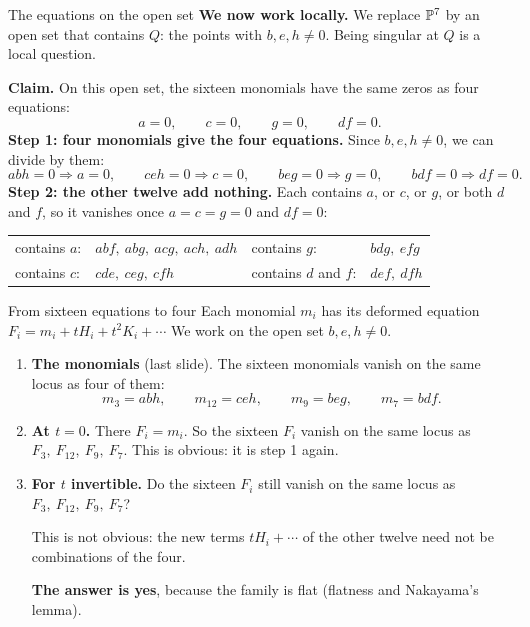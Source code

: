 \begin{frame}{The equations on the open set}
\textbf{We now work locally.} We replace \(\mathbb P^7\) by an open set that contains \(Q\): the points with \(b,e,h\ne0\). Being singular at \(Q\) is a local question.
\par\medskip
\textbf{Claim.} On this open set, the sixteen monomials have the same zeros as four equations:
\[
\boxed{a=0,\qquad c=0,\qquad g=0,\qquad df=0.}
\]
\textbf{Step 1: four monomials give the four equations.} Since \(b,e,h\ne0\), we can divide by them:
\[
abh=0\Rightarrow a=0,\qquad ceh=0\Rightarrow c=0,\qquad beg=0\Rightarrow g=0,\qquad bdf=0\Rightarrow df=0.
\]
\textbf{Step 2: the other twelve add nothing.} Each contains \(a\), or \(c\), or \(g\), or both \(d\) and \(f\), so it vanishes once \(a=c=g=0\) and \(df=0\):
\begin{center}
\begin{tabular}{ll@{\qquad}ll}
contains \(a\):&\(abf,\ abg,\ acg,\ ach,\ adh\)&contains \(g\):&\(bdg,\ efg\)\\
contains \(c\):&\(cde,\ ceg,\ cfh\)&contains \(d\) and \(f\):&\(def,\ dfh\)
\end{tabular}
\end{center}
\src{\textcolor{red}{This slide needs verification (not complicated, just need to check).}}
\end{frame}

\begin{frame}{From sixteen equations to four}
Each monomial \(m_i\) has its deformed equation \(F_i=m_i+tH_i+t^2K_i+\cdots\) We work on the open set \(b,e,h\ne0\).
\begin{enumerate}
\setlength{\itemsep}{9pt}
\item \textbf{The monomials} (last slide). The sixteen monomials vanish on the same locus as four of them:
\[
m_3=abh,\qquad m_{12}=ceh,\qquad m_9=beg,\qquad m_7=bdf.
\]
\item \textbf{At \(t=0\).} There \(F_i=m_i\). So the sixteen \(F_i\) vanish on the same locus as \(F_3,\ F_{12},\ F_9,\ F_7\). This is obvious: it is step 1 again.
\item \textbf{For \(t\) invertible.} Do the sixteen \(F_i\) still vanish on the same locus as \(F_3,\ F_{12},\ F_9,\ F_7\)?
\par\smallskip
This is not obvious: the new terms \(tH_i+\cdots\) of the other twelve need not be combinations of the four.
\par\smallskip
\textbf{The answer is yes}, because the family is flat (flatness and Nakayama's lemma).
\end{enumerate}
\end{frame}

